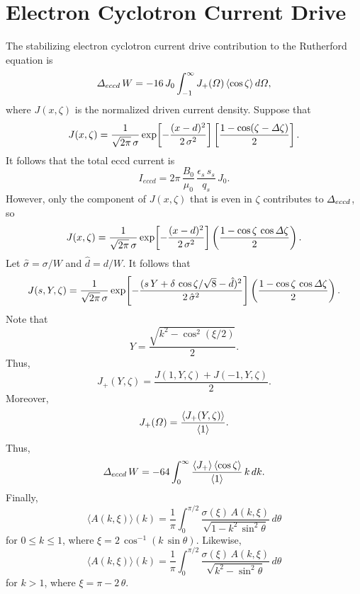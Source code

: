 \documentclass[12pt,prb,aps,notitlepage]{revtex4-1}
\begin{document}
\section{Electron Cyclotron Current Drive}
The stabilizing electron cyclotron current drive contribution to the Rutherford equation is
\begin{equation}
{\mit\Delta}_{eccd} \,W= -16\,J_0\int_{-1}^\infty J_+({\mit\Omega})\,\langle\cos\zeta\rangle\,d{\mit\Omega},
\end{equation}
where $J(x,\zeta)$ is the normalized driven current density. 
Suppose that
\begin{equation}
J(x,\zeta)= \frac{1}{\sqrt{2\pi}\,\sigma}\exp\!\left[-\frac{(x-d)^2}{2\,\sigma^2}\right]\left[\frac{1-\cos(\zeta-{\mit\Delta}\zeta)}{2}\right].
\end{equation}
It follows that the total eccd current is
\begin{equation}
I_{eccd} = 2\pi\,\frac{B_0}{\mu_0}\,\frac{\epsilon_s\,s_s}{q_s}\,J_0.
\end{equation}
However, only the component of $J(x,\zeta)$ that is even in $\zeta$ contributes to ${\mit\Delta}_{eccd}$, so 
\begin{equation}
J(x,\zeta)= \frac{1}{\sqrt{2\pi}\,\sigma}\exp\!\left[-\frac{(x-d)^2}{2\,\sigma^2}\right]\left(\frac{1-\cos\zeta\,\cos{\mit\Delta}\zeta}{2}\right).
\end{equation}
Let $\hat{\sigma}=\sigma/W$ and $\hat{d}=d/W$.  It follows that
\begin{equation}
J(s,Y,\zeta) =  \frac{1}{\sqrt{2\pi}\,\sigma}\exp\!\left[-\frac{(s\,Y+\delta\,\cos\zeta/\sqrt{8}-\hat{d})^2}{2\,\hat{\sigma}^2}\right]\left(\frac{1-\cos\zeta\,\cos{\mit\Delta}\zeta}{2}\right).
\end{equation}
Note that 
\begin{equation}
Y = \frac{\sqrt{k^2-\cos^2(\xi/2)}}{2}.
\end{equation}
Thus,
\begin{equation}
J_+(Y,\zeta) = \frac{J(1,Y,\zeta) + J(-1,Y,\zeta)}{2}.
\end{equation}
Moreover, 
\begin{equation}
J_+({\mit\Omega}) = \frac{\langle J_+(Y,\zeta)\rangle}{\langle 1\rangle}.
\end{equation}
Thus,
\begin{equation}
{\mit\Delta}_{eccd} \,W= -64\int_0^\infty \frac{\langle J_+\rangle\,\langle\cos\zeta\rangle}{\langle 1\rangle}\,k\,dk.
\end{equation}
Finally,
\begin{equation}
\langle A(k,\xi)\rangle(k) = \frac{1}{\pi}\int_0^{\pi/2}\frac{\sigma(\xi)\,A(k,\xi)}{\sqrt{1-k^2\,\sin^2\theta}}\,d\theta
\end{equation}
for $0\leq k\leq 1$, where $\xi=2\,\cos^{-1}(k\,\sin\theta)$. Likewise, 
\begin{equation}
\langle A(k,\xi)\rangle(k) = \frac{1}{\pi}\int_0^{\pi/2}\frac{\sigma(\xi)\,A(k,\xi)}{\sqrt{k^2-\sin^2\theta}}\,d\theta
\end{equation}
for $k>1$, where $\xi=\pi-2\,\theta$.
\end{document}
